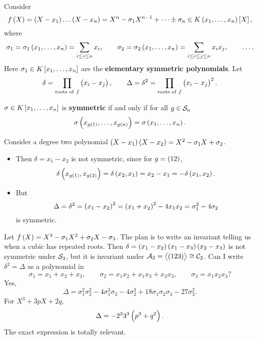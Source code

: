 
Consider
$$ f\br{X} = \br{X - x_1} \dots \br{X - x_n} = X^n - \sigma_1X^{n - 1} + \dots \pm \sigma_n \in K\br{x_1, \dots, x_n}\sbr{X}, $$
where
$$ \sigma_1 = \sigma_1\br{x_1, \dots, x_n} = \sum_{i \le i \le n} x_i, \qquad \sigma_2 = \sigma_2\br{x_1, \dots, x_n} = \sum_{i \le i \le j \le n} x_ix_j, \qquad \dots. $$
Here $ \sigma_1 \in K\sbr{x_1, \dots, x_n} $ are the \textbf{elementary symmetric polynomials}. Let
$$ \delta = \prod_{\text{roots of} \ f} \br{x_i - x_j}, \qquad \Delta = \delta^2 = \prod_{\text{roots of} \ f} \br{x_i - x_j}^2. $$

\pagebreak

\begin{definition}
$ \sigma \in K\sbr{x_1, \dots, x_n} $ is \textbf{symmetric} if and only if for all $ g \in \mathcal{S}_n $
$$ \sigma\br{x_{g\br{1}}, \dots, x_{g\br{n}}} = \sigma\br{x_1, \dots, x_n}. $$
\end{definition}

\begin{example*}
Consider a degree two polynomial $ \br{X - x_1}\br{X - x_2} = X^2 - \sigma_1X + \sigma_2 $.
\begin{itemize}
\item Then $ \delta = x_1 - x_2 $ is not symmetric, since for $ g = \br{12} $,
$$ \delta\br{x_{g\br{1}}, x_{g\br{2}}} = \delta\br{x_2, x_1} = x_2 - x_1 = -\delta\br{x_1, x_2}. $$
\item But
$$ \Delta = \delta^2 = \br{x_1 - x_2}^2 = \br{x_1 + x_2}^2 - 4x_1x_2 = \sigma_1^2 - 4\sigma_2 $$
is symmetric.
\end{itemize}
\end{example*}

\begin{example*}
Let $ f\br{X} = X^3 - \sigma_1X^2 + \sigma_2X - \sigma_3 $. The plan is to write an invariant telling us when a cubic has repeated roots. Then $ \delta = \br{x_1 - x_2}\br{x_1 - x_3}\br{x_2 - x_3} $ is not symmetric under $ \mathcal{S}_3 $, but it is invariant under $ \AAA_3 = \abr{\br{123}} \cong \CCC_2 $. Can I write $ \delta^2 = \Delta $ as a polynomial in
$$ \sigma_1 = x_1 + x_2 + x_3, \qquad \sigma_2 = x_1x_2 + x_1x_3 + x_2x_3, \qquad \sigma_3 = x_1x_2x_3? $$
Yes,
$$ \Delta = \sigma_1^2\sigma_2^2 - 4\sigma_1^3\sigma_3 - 4\sigma_2^3 + 18\sigma_1\sigma_2\sigma_3 - 27\sigma_3^2. $$
For $ X^3 + 3pX + 2q $,
$$ \Delta = -2^23^3\br{p^3 + q^2}. $$
The exact expression is totally relevant.
\end{example*}

